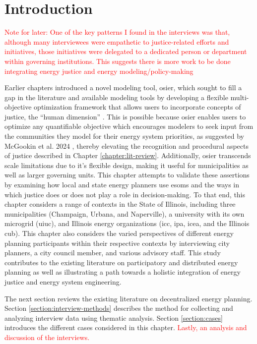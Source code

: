 \section{Introduction}

\textcolor{red}{Note for later: One of the key patterns I found in the
interviews was that, although many interviewees were empathetic to
justice-related efforts and initiatives, those initiatives were delegated to a
dedicated person or department within governing institutions. This suggests
there is more work to be done integrating energy justice and energy
modeling/policy-making}

Earlier chapters introduced a novel modeling tool, \ac{osier}, which sought to
fill a gap in the literature and available modeling tools by developing a
flexible multi-objective optimization framework that allows users to incorporate
concepts of justice, the ``human dimension'' \cite{pfenninger_energy_2014}. This
is possible because \ac{osier} enables users to optimize any quantifiable
objective which encourages modelers to seek input from the communities they
model for their energy system priorities, as suggested by McGookin et al. 2024
\cite{mcgookin_advancing_2024}, thereby elevating the recognition and procedural
aspects of justice described in Chapter \ref{chapter:lit-review}. Additionally,
\ac{osier} transcends scale limitations due to it's flexible design, making it
useful for municipalities as well as larger governing units. This chapter
attempts to validate these assertions by examining how local and state energy
planners use \acp{esom} and the ways in which justice does or does not play a
role in decision-making. To that end, this chapter considers a range of contexts
in the State of Illinois, including three municipalities (Champaign, Urbana, and
Naperville), a university with its own microgrid (\acf{uiuc}), and Illinois
energy organizations (\acf{icc}, \acf{ipa}, \acf{icea}, and the Illinois
\acf{cub}). This chapter also considers the varied perspectives of different
energy planning participants within their respective contexts by interviewing
city planners, a city council member, and various advisory staff. This study
contributes to the existing literature on participatory and distributed energy
planning as well as illustrating a path towards a holistic integration of energy
justice and energy system engineering.

The next section reviews the existing literature on decentralized energy
planning. Section \ref{section:interview-methods} describes the method for
collecting and analyzing interview data using thematic analysis. Section
\ref{section:cases} introduces the different cases considered in this chapter.
\textcolor{red}{Lastly, an analysis and discussion of the interviews.}


